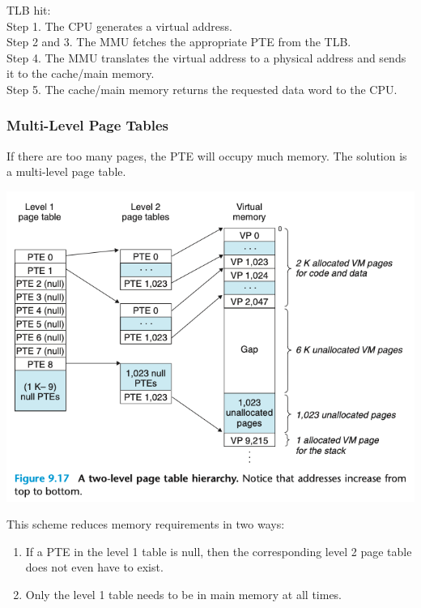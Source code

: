 \documentclass[11pt]{article}
\begin{document}
TLB hit:\\
Step 1. The CPU generates a virtual address.\\
Step 2 and 3. The MMU fetches the appropriate PTE from the TLB.\\
Step 4. The MMU translates the virtual address to a physical address and sends it to the cache/main memory.\\
Step 5. The cache/main memory returns the requested data word to the CPU.\\

\subsubsection{Multi-Level Page Tables}
\label{sec:orgb7309de}

If there are too many pages, the PTE will occupy much memory. The solution is a multi-level page table.\\

\begin{center}
\includegraphics[width=.9\linewidth]{pics/figure9.17-two-level-page-table.png}
\end{center}

This scheme reduces memory requirements in two ways:\\
\begin{enumerate}
\item If a PTE in the level 1 table is null, then the corresponding level 2 page table does not even have to exist.\\
\item Only the level 1 table needs to be in main memory at all times.\\
\end{enumerate}
\end{document}
